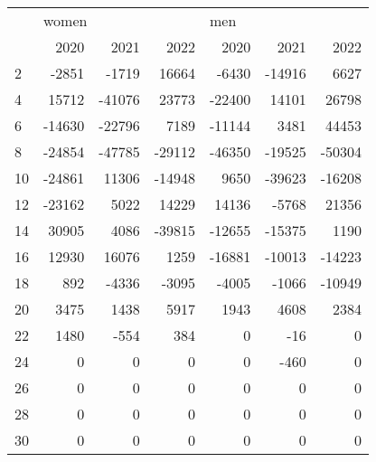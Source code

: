 \begin{tabular}{lrrrrrr}
\toprule
{} & \multicolumn{3}{l}{women} & \multicolumn{3}{l}{men} \\
{} &   2020 &   2021 &   2022 &   2020 &   2021 &   2022 \\
\midrule
2  &  -2851 &  -1719 &  16664 &  -6430 & -14916 &   6627 \\
4  &  15712 & -41076 &  23773 & -22400 &  14101 &  26798 \\
6  & -14630 & -22796 &   7189 & -11144 &   3481 &  44453 \\
8  & -24854 & -47785 & -29112 & -46350 & -19525 & -50304 \\
10 & -24861 &  11306 & -14948 &   9650 & -39623 & -16208 \\
12 & -23162 &   5022 &  14229 &  14136 &  -5768 &  21356 \\
14 &  30905 &   4086 & -39815 & -12655 & -15375 &   1190 \\
16 &  12930 &  16076 &   1259 & -16881 & -10013 & -14223 \\
18 &    892 &  -4336 &  -3095 &  -4005 &  -1066 & -10949 \\
20 &   3475 &   1438 &   5917 &   1943 &   4608 &   2384 \\
22 &   1480 &   -554 &    384 &      0 &    -16 &      0 \\
24 &      0 &      0 &      0 &      0 &   -460 &      0 \\
26 &      0 &      0 &      0 &      0 &      0 &      0 \\
28 &      0 &      0 &      0 &      0 &      0 &      0 \\
30 &      0 &      0 &      0 &      0 &      0 &      0 \\
\bottomrule
\end{tabular}
